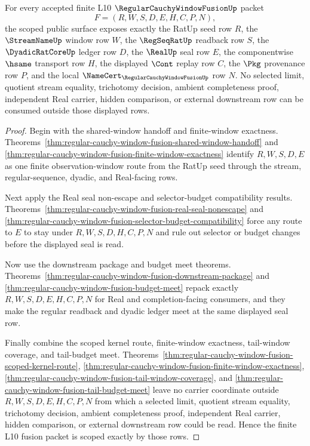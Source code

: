 \begin{theorem}
\label{thm:regular-cauchy-window-fusion-scoped-row-exhaustion}
For every accepted finite L10 $\RegularCauchyWindowFusionUp$ packet
$$
F=(R,W,S,D,E,H,C,P,N),
$$
the scoped public surface exposes exactly the RatUp seed row $R$, the $\StreamNameUp$ window row $W$, the $\RegSeqRatUp$ readback row $S$, the $\DyadicRatCoreUp$ ledger row $D$, the $\RealUp$ seal row $E$, the componentwise $\hsame$ transport row $H$, the displayed $\Cont$ replay row $C$, the $\Pkg$ provenance row $P$, and the local $\NameCert_{\RegularCauchyWindowFusionUp}$ row $N$. No selected limit, quotient stream equality, trichotomy decision, ambient completeness proof, independent Real carrier, hidden comparison, or external downstream row can be consumed outside those displayed rows.
\end{theorem}
\begin{proof}
Begin with the shared-window handoff and finite-window exactness. Theorems~\ref{thm:regular-cauchy-window-fusion-shared-window-handoff} and \ref{thm:regular-cauchy-window-fusion-finite-window-exactness} identify $R,W,S,D,E$ as one finite observation-window route from the RatUp seed through the stream, regular-sequence, dyadic, and Real-facing rows.

Next apply the Real seal non-escape and selector-budget compatibility results. Theorems~\ref{thm:regular-cauchy-window-fusion-real-seal-nonescape} and \ref{thm:regular-cauchy-window-fusion-selector-budget-compatibility} force any route to $E$ to stay under $R,W,S,D,H,C,P,N$ and rule out selector or budget changes before the displayed seal is read.

Now use the downstream package and budget meet theorems. Theorems~\ref{thm:regular-cauchy-window-fusion-downstream-package} and \ref{thm:regular-cauchy-window-fusion-budget-meet} repack exactly $R,W,S,D,E,H,C,P,N$ for Real and completion-facing consumers, and they make the regular readback and dyadic ledger meet at the same displayed seal row.

Finally combine the scoped kernel route, finite-window exactness, tail-window coverage, and tail-budget meet. Theorems~\ref{thm:regular-cauchy-window-fusion-scoped-kernel-route}, \ref{thm:regular-cauchy-window-fusion-finite-window-exactness}, \ref{thm:regular-cauchy-window-fusion-tail-window-coverage}, and \ref{thm:regular-cauchy-window-fusion-tail-budget-meet} leave no carrier coordinate outside $R,W,S,D,E,H,C,P,N$ from which a selected limit, quotient stream equality, trichotomy decision, ambient completeness proof, independent Real carrier, hidden comparison, or external downstream row could be read. Hence the finite L10 fusion packet is scoped exactly by those rows.
\end{proof}

